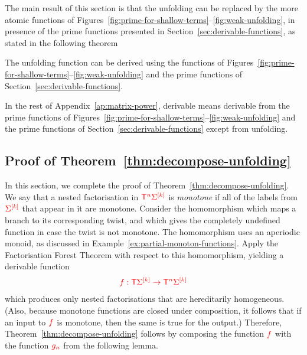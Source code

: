 The main result of this section is that the unfolding can be replaced by the more atomic functions of Figures~\ref{fig:prime-for-shallow-terms}--\ref{fig:weak-unfolding}, in  presence of the prime functions presented in Section~\ref{sec:derivable-functions}, as stated in the following theorem
 
\begin{theorem}\label{thm:decompose-unfolding}
The unfolding function can be derived using the functions of Figures~\ref{fig:prime-for-shallow-terms}--\ref{fig:weak-unfolding} and the prime functions of Section~\ref{sec:derivable-functions}.
\end{theorem}

In the rest of Appendix~\ref{ap:matrix-power}, derivable means derivable from the prime functions of Figures~\ref{fig:prime-for-shallow-terms}--\ref{fig:weak-unfolding} and the prime functions of Section~\ref{sec:derivable-functions} except from unfolding.







\subsection{Proof of Theorem~\ref{thm:decompose-unfolding}}
\label{sec:monotone-unfold-proof}
In this section, we complete the proof of Theorem~\ref{thm:decompose-unfolding}.  We say that a nested factorisation in ${\color{red}{\mathsf T}}^{{\color{red}{n}}} {\color{red}{\Sigma}}^{{\color{red}{[k]}}}$ is \emph{monotone} if all of the labels from ${\color{red}{\Sigma}}^{{\color{red}{[k]}}}$ that appear in it are monotone. 
Consider the homomorphism which maps a branch to its corresponding twist, and which gives the completely undefined function in case the twist is not monotone.  The homomorphism uses an aperiodic monoid, as discussed in Example~\ref{ex:partial-monoton-functions}. 
 Apply the Factorisation Forest Theorem with respect to this homomorphism, yielding a derivable function
\begin{align*}
{\color{red}{ f : {\color{red}{\mathsf T}}{\color{red}{\Sigma}}^{{\color{red}{[k]}}} \to {\color{red}{\mathsf T}}^{{\color{red}{n}}} {\color{red}{\Sigma}}^{{\color{red}{[k]}}}}}
\end{align*}
which produces only nested factorisations that are  hereditarily homogeneous. (Also, because monotone functions are closed under composition, it follows that if  an input to ${\color{red}{f}}$ is monotone, then the same is true for the output.) Therefore,  Theorem~\ref{thm:decompose-unfolding} follows by composing the function ${\color{red}{f}}$ with the function ${\color{red}{g_n}}$ from the following lemma. 

